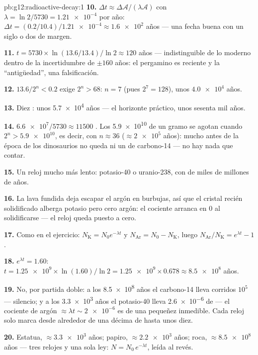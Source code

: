 \begin{solution}{pb:g12:radioactive-decay:1}
\textbf{10.} $\Delta t \approx \Delta\mathcal A/(\lambda\mathcal A)$ con
$\lambda = \ln 2/5730 = \num{1.21e-4}$ por año:
$\Delta t = (0.2/10.4)/\num{1.21e-4} \approx \num{1.6e2}$ años --- una
fecha buena con un siglo o dos de margen.

\textbf{11.} $t = \num{5730} \times \ln(13.6/13.4)/\ln 2 \approx 120$
años --- indistinguible de lo moderno dentro de la incertidumbre de
$\pm 160$ años: el pergamino es reciente y la ``antigüedad'', una
falsificación.

\textbf{12.} $13.6/2^n < 0.2$ exige $2^n > 68$: $n = 7$  (pues
$2^7 = 128$), unos $\num{4.0e4}$ años.

\textbf{13.} Diez : unos \num{5.7e4} años --- el horizonte
práctico, unos sesenta mil años.

\textbf{14.} $\num{6.6e7}/\num{5730} \approx \num{11500}$ . Los
\num{5.9e10}  de un gramo se agotan cuando
$2^n > \num{5.9e10}$, es decir, con $n \approx 36$ 
($\approx \num{2e5}$ años): mucho antes de la época de los dinosaurios
no queda ni un  de carbono-14 --- no hay nada que contar.

\textbf{15.} Un reloj mucho más lento: potasio-40 o uranio-238, con
 de miles de millones de años.

\textbf{16.} La lava fundida deja escapar el argón en burbujas, así que
el cristal recién solidificado alberga potasio pero cero argón: el
cociente arranca en $0$ al solidificarse --- el reloj queda puesto a
cero.

\textbf{17.} Como en el ejercicio: $N_{\mathrm K} = N_0 e^{-\lambda t}$
y $N_{\mathrm{Ar}} = N_0 - N_{\mathrm K}$, luego
$N_{\mathrm{Ar}}/N_{\mathrm K} = e^{\lambda t} - 1$.

\textbf{18.} $e^{\lambda t} = 1.60$:
$t = \num{1.25e9} \times \ln(1.60)/\ln 2 = \num{1.25e9} \times 0.678
\approx \num{8.5e8}$ años.

\textbf{19.} No, por partida doble: a los \num{8.5e8} años el
carbono-14 lleva corridos $10^5$  --- silencio; y a los
\num{3.3e3} años el potasio-40 lleva \num{2.6e-6} de  --- el
cociente de argón $\approx \lambda t \sim \num{2e-6}$ es de una pequeñez
inmedible. Cada reloj solo marca desde alrededor de una décima de
 hasta unos diez.

\textbf{20.} Estatua, $\approx \num{3.3e3}$ años; papiro,
$\approx \num{2.2e3}$ años; roca, $\approx \num{8.5e8}$ años --- tres
relojes y una sola ley: $N = N_0\,e^{-\lambda t}$, leída al revés.
\end{solution}
